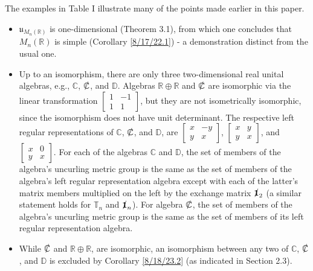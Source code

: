 \documentclass{amsart}
\numberwithin{equation}{section}
\theoremstyle{definition}
\numberwithin{theorem}{section}
\begin{document}
\bigskip

The examples in Table I illustrate many of the points made earlier in this paper.    
 
\begin{itemize}\item $\mathfrak{u}_{M_n(\mathbb{R})}$ is one-dimensional (Theorem 3.1), from which one concludes that $M_n(\mathbb{R})$ is simple (Corollary \ref{8/17/22.1}) - a demonstration distinct from the usual one.
\item Up to an isomorphism, there are only three two-dimensional real unital algebras, e.g., $\mathbb{C}$, $\slashed{\mathbb{C}}$, and $\mathbb{D}$.  Algebras $\mathbb{R}\oplus\mathbb{R}$ and $\slashed{\mathbb{C}}$ are isomorphic via the linear transformation $\left[\begin{array}{ccc}
 1 & -1   \\ 
 1 & 1    
\end{array}\right]$, but they are not isometrically isomorphic, since the isomorphism does not have unit determinant.  The respective left regular representations of $\mathbb{C}$, $\slashed{\mathbb{C}}$, and $\mathbb{D}$, are $\left[\begin{array}{ccc}
 x & -y   \\ 
 y & x    
\end{array}\right]$, $\left[\begin{array}{ccc}
 x & y   \\ 
 y & x    
\end{array}\right]$, and $\left[\begin{array}{ccc}
 x & 0   \\ 
 y & x    
\end{array}\right]$.  For each of the algebras $\mathbb{C}$ and $\mathbb{D}$, the set of members of the algebra's uncurling metric group is the same as the set of members of the algebra's left regular representation algebra except with each of the latter's matrix members multiplied on the left by the exchange matrix $\slashed{\mathbf{1}}_2$ (a similar statement holds for $\mathbb{T}_n$ and $\slashed{\mathbf{1}}_n$). For algebra $\slashed{\mathbb{C}}$, the set of members of the algebra's uncurling metric group is the same as the set of members of its left regular representation algebra. \item While $\slashed{\mathbb{C}}$ and $\mathbb{R}\oplus\mathbb{R}$, are isomorphic, an isomorphism between any two of $\mathbb{C}$, $\slashed{\mathbb{C}}$, and $\mathbb{D}$ is excluded by Corollary \ref{8/18/23.2} (as indicated in Section 2.3).  

\end{itemize}
\end{document}
